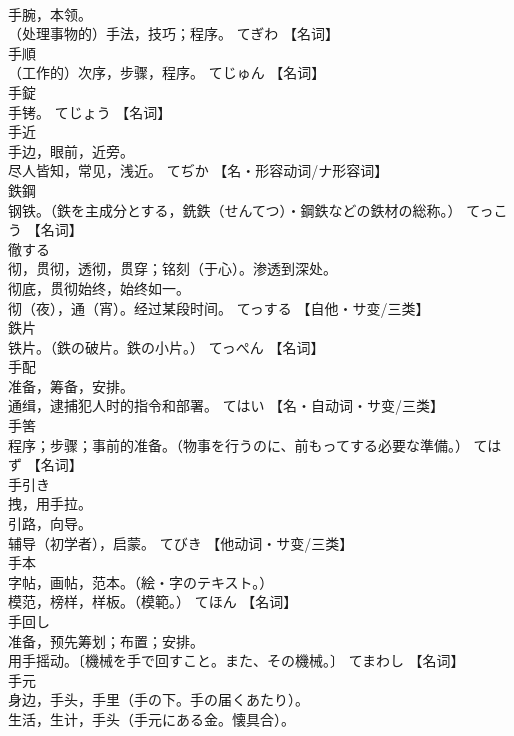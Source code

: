 \documentclass[8pt]{extreport}
\begin{document}
\begin{CJK}{UTF8}{min}
\\	手腕，本领。 
\\	（处理事物的）手法，技巧；程序。	てぎわ		【名词】
\\	手順	
\\	（工作的）次序，步骤，程序。	てじゅん		【名词】
\\	手錠	
\\	手铐。	てじょう		【名词】
\\	手近	
\\	手边，眼前，近旁。 
\\	尽人皆知，常见，浅近。	てぢか		【名・形容动词/ナ形容词】
\\	鉄鋼	
\\	钢铁。（鉄を主成分とする，銑鉄（せんてつ）・鋼鉄などの鉄材の総称。）	てっこう		【名词】
\\	徹する	
\\	彻，贯彻，透彻，贯穿；铭刻（于心）。渗透到深处。 
\\	彻底，贯彻始终，始终如一。 
\\	彻（夜），通（宵）。经过某段时间。	てっする		【自他・サ变/三类】
\\	鉄片	
\\	铁片。（鉄の破片。鉄の小片。）	てっぺん		【名词】
\\	手配	
\\	准备，筹备，安排。 
\\	通缉，逮捕犯人时的指令和部署。	てはい		【名・自动词・サ变/三类】
\\	手筈	
\\	程序；步骤；事前的准备。（物事を行うのに、前もってする必要な準備。）	てはず		【名词】
\\	手引き	
\\	拽，用手拉。 
\\	引路，向导。 
\\	辅导（初学者），启蒙。	てびき		【他动词・サ变/三类】
\\	手本	
\\	字帖，画帖，范本。（絵・字のテキスト。） 
\\	模范，榜样，样板。（模範。）	てほん		【名词】
\\	手回し	
\\	准备，预先筹划；布置；安排。 
\\	用手摇动。〔機械を手で回すこと。また、その機械。〕	てまわし		【名词】
\\	手元	
\\	身边，手头，手里（手の下。手の届くあたり）。 
\\	生活，生计，手头（手元にある金。懐具合）。 

\end{CJK}
\end{document}
